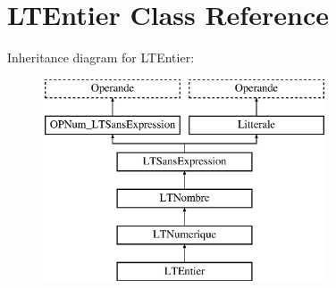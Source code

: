 \hypertarget{class_l_t_entier}{}\section{L\+T\+Entier Class Reference}
\label{class_l_t_entier}
Inheritance diagram for L\+T\+Entier\+:\begin{figure}[H]
\begin{center}
\leavevmode
\includegraphics[height=6.000000cm]{class_l_t_entier}
\end{center}
\end{figure}
